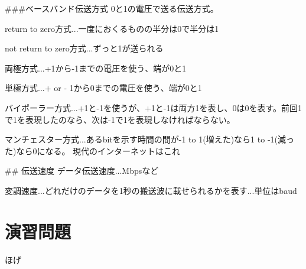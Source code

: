 ###ベースバンド伝送方式
0と1の電圧で送る伝送方式。

return to zero方式...一度におくるものの半分は0で半分は1

not return to zero方式...ずっと1が送られる

両極方式...+1から-1までの電圧を使う、端が0と1

単極方式...+ or - 1から0までの電圧を使う、端が0と1

バイポーラー方式...+1と-1を使うが、+1と-1は両方1を表し、0は0を表す。前回1で1を表現したのなら、次は-1で1を表現しなければならない。

マンチェスター方式...あるbitを示す時間の間が-1 to 1(増えた)なら1 to -1(減った)なら0になる。
現代のインターネットはこれ


## 伝送速度
データ伝送速度...Mbpsなど

変調速度...どれだけのデータを1秒の搬送波に載せられるかを表す...単位はbaud





\section{}

\section*{演習問題}
\begin{problems}
\item ほげ
\end{problems}
